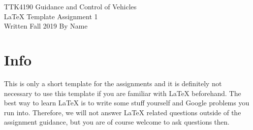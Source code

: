\documentclass[a4paper]{article}
\begin{document}
\begin{titlepage}
\begin{center}
\Large TTK4190 Guidance and Control of Vehicles \\
\vspace{10pt}
\Large \LaTeX{} Template Assignment 1 \\
\vspace{10pt}
\large Written Fall 2019 By Name
\end{center}
\end{titlepage}

\section*{Info}
This is only a short template for the assignments and it is definitely not necessary to use this template if you are familiar with \LaTeX{} beforehand. The best way to learn \LaTeX{} is to write some stuff yourself and Google problems you run into. Therefore, we will not answer \LaTeX{} related questions outside of the assignment guidance, but you are of course welcome to ask questions then.


 


\end{document}
